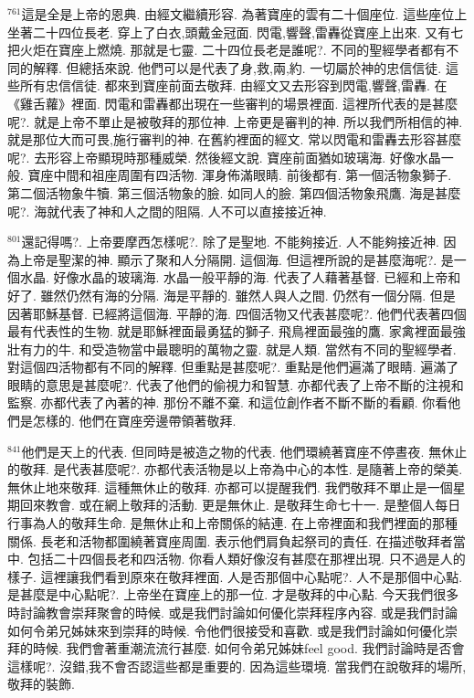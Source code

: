 \documentclass{book}
\begin{document}
$^{761}$這是全是上帝的恩典.
由經文繼續形容.
為著寶座的雲有二十個座位.
這些座位上坐著二十四位長老.
穿上了白衣,頭戴金冠面.
閃電,響聲,雷轟從寶座上出來.
又有七把火炬在寶座上燃燒.
那就是七靈.
二十四位長老是誰呢?.
不同的聖經學者都有不同的解釋.
但總括來說.
他們可以是代表了身,救,兩,約.
一切屬於神的忠信信徒.
這些所有忠信信徒.
都來到寶座前面去敬拜.
由經文又去形容到閃電,響聲,雷轟.
在《雞舌蘿》裡面.
閃電和雷轟都出現在一些審判的場景裡面.
這裡所代表的是甚麼呢?.
就是上帝不單止是被敬拜的那位神.
上帝更是審判的神.
所以我們所相信的神.
就是那位大而可畏,施行審判的神.
在舊約裡面的經文.
常以閃電和雷轟去形容甚麼呢?.
去形容上帝顯現時那種威榮.
然後經文說.
寶座前面猶如玻璃海.
好像水晶一般.
寶座中間和祖座周圍有四活物.
渾身佈滿眼睛.
前後都有.
第一個活物象獅子.
第二個活物象牛犢.
第三個活物象的臉.
如同人的臉.
第四個活物象飛鷹.
海是甚麼呢?.
海就代表了神和人之間的阻隔.
人不可以直接接近神.

$^{801}$還記得嗎?.
上帝要摩西怎樣呢?.
除了是聖地.
不能夠接近.
人不能夠接近神.
因為上帝是聖潔的神.
顯示了聚和人分隔開.
這個海.
但這裡所說的是甚麼海呢?.
是一個水晶.
好像水晶的玻璃海.
水晶一般平靜的海.
代表了人藉著基督.
已經和上帝和好了.
雖然仍然有海的分隔.
海是平靜的.
雖然人與人之間.
仍然有一個分隔.
但是因著耶穌基督.
已經將這個海.
平靜的海.
四個活物又代表甚麼呢?.
他們代表著四個最有代表性的生物.
就是耶穌裡面最勇猛的獅子.
飛鳥裡面最強的鷹.
家禽裡面最強壯有力的牛.
和受造物當中最聰明的萬物之靈.
就是人類.
當然有不同的聖經學者.
對這個四活物都有不同的解釋.
但重點是甚麼呢?.
重點是他們遍滿了眼睛.
遍滿了眼睛的意思是甚麼呢?.
代表了他們的偷視力和智慧.
亦都代表了上帝不斷的注視和監察.
亦都代表了內著的神.
那份不離不棄.
和這位創作者不斷不斷的看顧.
你看他們是怎樣的.
他們在寶座旁邊帶領著敬拜.

$^{841}$他們是天上的代表.
但同時是被造之物的代表.
他們環繞著寶座不停晝夜.
無休止的敬拜.
是代表甚麼呢?.
亦都代表活物是以上帝為中心的本性.
是隨著上帝的榮美.
無休止地來敬拜.
這種無休止的敬拜.
亦都可以提醒我們.
我們敬拜不單止是一個星期回來教會.
或在網上敬拜的活動.
更是無休止.
是敬拜生命七十一.
是整個人每日行事為人的敬拜生命.
是無休止和上帝關係的結連.
在上帝裡面和我們裡面的那種關係.
長老和活物都圍繞著寶座周圍.
表示他們肩負起祭司的責任.
在描述敬拜者當中.
包括二十四個長老和四活物.
你看人類好像沒有甚麼在那裡出現.
只不過是人的樣子.
這裡讓我們看到原來在敬拜裡面.
人是否那個中心點呢?.
人不是那個中心點.
是甚麼是中心點呢?.
上帝坐在寶座上的那一位.
才是敬拜的中心點.
今天我們很多時討論教會崇拜聚會的時候.
或是我們討論如何優化崇拜程序內容.
或是我們討論如何令弟兄姊妹來到崇拜的時候.
令他們很接受和喜歡.
或是我們討論如何優化崇拜的時候.
我們會著重潮流流行甚麼.
如何令弟兄姊妹feel good.
我們討論時是否會這樣呢?.
沒錯,我不會否認這些都是重要的.
因為這些環境.
當我們在說敬拜的場所,敬拜的裝飾.
\end{document}
